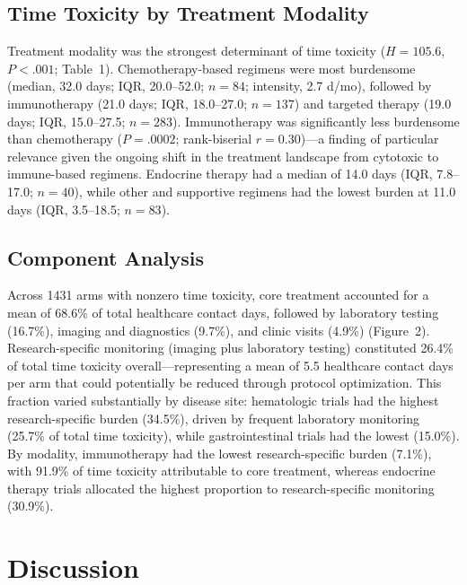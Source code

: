 \documentclass[12pt]{article}
\begin{document}
\subsection*{Time Toxicity by Treatment Modality}

Treatment modality was the strongest determinant of time toxicity ($H = 105.6$, $P < .001$; Table~1). Chemotherapy-based regimens were most burdensome (median, 32.0 days; IQR, 20.0--52.0; $n = 84$; intensity, 2.7 d/mo), followed by immunotherapy (21.0 days; IQR, 18.0--27.0; $n = 137$) and targeted therapy (19.0 days; IQR, 15.0--27.5; $n = 283$). Immunotherapy was significantly less burdensome than chemotherapy ($P = .0002$; rank-biserial $r = 0.30$)---a finding of particular relevance given the ongoing shift in the treatment landscape from cytotoxic to immune-based regimens. Endocrine therapy had a median of 14.0 days (IQR, 7.8--17.0; $n = 40$), while other and supportive regimens had the lowest burden at 11.0 days (IQR, 3.5--18.5; $n = 83$).

\subsection*{Component Analysis}

Across 1431 arms with nonzero time toxicity, core treatment accounted for a mean of 68.6\% of total healthcare contact days, followed by laboratory testing (16.7\%), imaging and diagnostics (9.7\%), and clinic visits (4.9\%) (Figure~2). Research-specific monitoring (imaging plus laboratory testing) constituted 26.4\% of total time toxicity overall---representing a mean of 5.5 healthcare contact days per arm that could potentially be reduced through protocol optimization. This fraction varied substantially by disease site: hematologic trials had the highest research-specific burden (34.5\%), driven by frequent laboratory monitoring (25.7\% of total time toxicity), while gastrointestinal trials had the lowest (15.0\%). By modality, immunotherapy had the lowest research-specific burden (7.1\%), with 91.9\% of time toxicity attributable to core treatment, whereas endocrine therapy trials allocated the highest proportion to research-specific monitoring (30.9\%).

\section*{Discussion}
\end{document}
